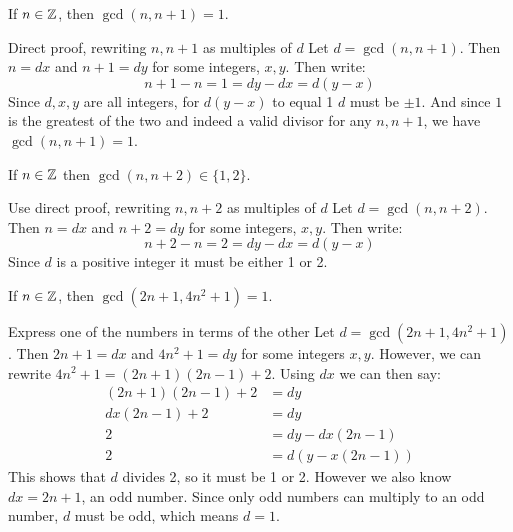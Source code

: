 \documentclass{article}
\begin{document}
\begin{problem}
If $n \in \mathbb{Z}$, then $\gcd(n, n+1) = 1$.
\end{problem}
\begin{solution}{{Direct proof, rewriting $n, n+1$ as multiples of $d$}}
  Let $d = \gcd(n, n+1)$. Then $n = dx$ and $n + 1 = dy$ for some integers, $x, y$. Then write:
  $$n + 1 - n = 1 = dy - dx = d(y - x)$$
  Since $d, x, y$ are all integers, for $d(y - x)$ to equal 1 $d$ must be $\pm1$. And since $1$ is the greatest of the two and indeed a valid divisor for any $n, n+1$, we have $\gcd(n, n+1) = 1$.
\end{solution}
\begin{problem}
If $n \in \mathbb{Z}$ then $\gcd(n, n+2) \in \{1, 2\}$.
\end{problem}
\begin{solution}{{Use direct proof, rewriting $n, n+2$ as multiples of $d$}}
  Let $d = \gcd(n, n+2)$. Then $n = dx$ and $n + 2 = dy$ for some integers, \(x, y\). Then write:
  \[n + 2 - n = 2 = dy - dx = d(y - x)\]
  Since \(d\) is a positive integer it must be either 1 or 2.
\end{solution}

\begin{problem}
If \(n \in \mathbb{Z}\), then \(\gcd(2n+1, 4n^2+1) = 1\).
\end{problem}
\begin{solution}{Express one of the numbers in terms of the other}
  Let \(d = \gcd(2n+1, 4n^2+1)\). Then \(2n+1 = dx\) and \(4n^2+1 = dy\) for some integers \(x, y\). However, we can rewrite \(4n^2 + 1 = (2n+1)(2n-1) +2\). Using \(dx\) we can then say:
  \begin{align*}
    (2n+1)(2n-1) + 2 & = dy             \\
    dx(2n-1) + 2     & = dy             \\
    2                & = dy - dx(2n-1)  \\
    2                & = d(y - x(2n-1))
  \end{align*}
  This shows that \(d\) divides 2, so it must be 1 or 2. However we also know \(dx = 2n + 1\), an odd number. Since only odd numbers can multiply to an odd number, \(d\) must be odd, which means \(d = 1\).
\end{solution}
\end{document}
